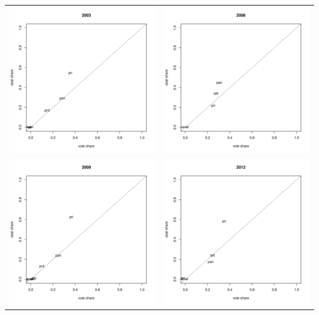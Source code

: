 \documentclass[xcolor=dvipsnames]{beamer}  %
\begin{document}
{\begin{center}
\begin{tabular}{cc}
   \includegraphics[width=.3\textwidth]{../../graphs/vsNosims2003.pdf} &
   \includegraphics[width=.3\textwidth]{../../graphs/vsNosims2006.pdf} \\
   \includegraphics[width=.3\textwidth]{../../graphs/vsNosims2009.pdf} &
   \includegraphics[width=.3\textwidth]{../../graphs/vsNosims2012.pdf} \\
\end{tabular}
\end{center}
}
\end{document}
